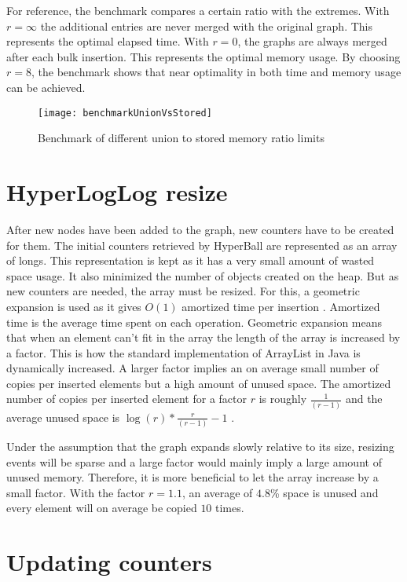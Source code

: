 For reference, the benchmark compares a certain ratio with the extremes. With $r = \infty$ the additional entries are never merged with the original graph. This represents the optimal elapsed time. With $r = 0$, the graphs are always merged after each bulk insertion. This represents the optimal memory usage. By choosing $r = 8$, the benchmark shows that near optimality in both time and memory usage can be achieved. 
\begin{figure}[h]
\centering
\texttt{[image: benchmarkUnionVsStored]}    
\captionsetup{justification=centering}
\caption {Benchmark of different union to stored memory ratio limits}
\label{fig:benchmarkUnionVsStored}
\end{figure}


\section{HyperLogLog resize}
After new nodes have been added to the graph, new counters have to be created for them. The initial counters retrieved by HyperBall are represented as an array of longs. This representation is kept as it has a very small amount of wasted space usage. It also minimized the number of objects created on the heap. But as new counters are needed, the array must be resized. For this, a geometric expansion is used as it gives $O(1)$ amortized time per insertion \cite{dynamicarrays}. Amortized time is the average time spent on each operation. Geometric expansion means that when an element can't fit in the array the length of the array is increased by a factor. This is how the standard implementation of ArrayList in Java is dynamically increased. A larger factor implies an on average small number of copies per inserted elements but a high amount of unused space. The amortized number of copies per inserted element for a factor $r$ is roughly $\frac{1}{(r-1)}$ and the average unused space is $\log(r)*\frac{r}{(r-1)} - 1$ \cite{dynamicarrays}.

Under the assumption that the graph expands slowly relative to its size, resizing events will be sparse and a large factor would mainly imply a large amount of unused memory. Therefore, it is more beneficial to let the array increase by a small factor. With the factor $r = 1.1$, an average of $4.8$\% space is unused and every element will on average be copied $10$ times.

\section{Updating counters}

